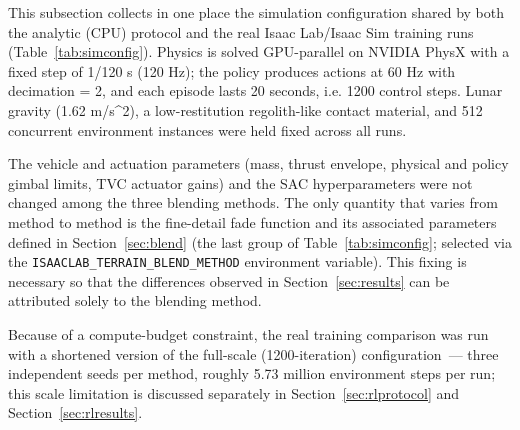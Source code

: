 This subsection collects in one place the simulation configuration shared by both the analytic (CPU) protocol and the real Isaac Lab/Isaac Sim training runs (Table~\ref{tab:simconfig}). Physics is solved GPU-parallel on NVIDIA PhysX with a fixed step of 1/120 s (120 Hz); the policy produces actions at 60 Hz with decimation = 2, and each episode lasts 20 seconds, i.e. 1200 control steps. Lunar gravity (1.62 m/s\textasciicircum{}2), a low-restitution regolith-like contact material, and 512 concurrent environment instances were held fixed across all runs.

The vehicle and actuation parameters (mass, thrust envelope, physical and policy gimbal limits, TVC actuator gains) and the SAC hyperparameters were not changed among the three blending methods. The only quantity that varies from method to method is the fine-detail fade function and its associated parameters defined in Section~\ref{sec:blend} (the last group of Table~\ref{tab:simconfig}; selected via the \texttt{ISAACLAB\_TERRAIN\_BLEND\_METHOD} environment variable). This fixing is necessary so that the differences observed in Section~\ref{sec:results} can be attributed solely to the blending method.

Because of a compute-budget constraint, the real training comparison was run with a shortened version of the full-scale (1200-iteration) configuration~--- three independent seeds per method, roughly 5.73 million environment steps per run; this scale limitation is discussed separately in Section~\ref{sec:rlprotocol} and Section~\ref{sec:rlresults}.
